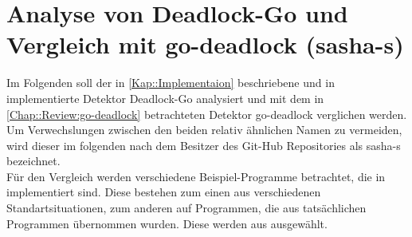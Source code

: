 \chapter{Analyse von Deadlock-Go und Vergleich mit 
    go-deadlock (sasha-s)}
Im Folgenden soll der in \ref{Kap::Implementaion} beschriebene und in 
\cite{implementation} implementierte Detektor \glqq Deadlock-Go \grqq analysiert 
und mit dem in 
\ref{Chap::Review:go-deadlock} betrachteten Detektor \glqq go-deadlock \grqq verglichen
werden. Um Verwechslungen zwischen den beiden relativ ähnlichen Namen zu vermeiden,
wird dieser im folgenden nach dem Besitzer des Git-Hub Repositories als sasha-s
bezeichnet.\\
Für den Vergleich werden verschiedene Beispiel-Programme betrachtet, die in 
\cite{examples} implementiert sind. Diese bestehen zum einen aus verschiedenen 
Standartsituationen, zum anderen auf Programmen, die aus tatsächlichen
Programmen übernommen wurden. Diese werden aus \cite{gobench} ausgewählt.
